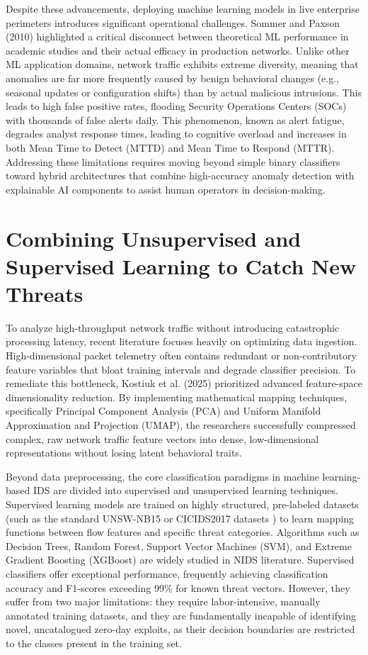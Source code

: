 \documentclass[12pt,a4paper]{report}
\begin{document}
Despite these advancements, deploying machine learning models in live enterprise perimeters introduces significant operational challenges. Sommer and Paxson (2010) \cite{sommer2010} highlighted a critical disconnect between theoretical ML performance in academic studies and their actual efficacy in production networks. Unlike other ML application domains, network traffic exhibits extreme diversity, meaning that anomalies are far more frequently caused by benign behavioral changes (e.g., seasonal updates or configuration shifts) than by actual malicious intrusions. This leads to high false positive rates, flooding Security Operations Centers (SOCs) with thousands of false alerts daily. This phenomenon, known as alert fatigue, degrades analyst response times, leading to cognitive overload and increases in both Mean Time to Detect (MTTD) and Mean Time to Respond (MTTR). Addressing these limitations requires moving beyond simple binary classifiers toward hybrid architectures that combine high-accuracy anomaly detection with explainable AI components to assist human operators in decision-making.

\section{Combining Unsupervised and Supervised Learning to Catch New Threats}

To analyze high-throughput network traffic without introducing catastrophic processing latency, recent literature focuses heavily on optimizing data ingestion. High-dimensional packet telemetry often contains redundant or non-contributory feature variables that bloat training intervals and degrade classifier precision. To remediate this bottleneck, Kostiuk et al. (2025) \cite{kostiuk2025} prioritized advanced feature-space dimensionality reduction. By implementing mathematical mapping techniques, specifically Principal Component Analysis (PCA) and Uniform Manifold Approximation and Projection (UMAP), the researchers successfully compressed complex, raw network traffic feature vectors into dense, low-dimensional representations without losing latent behavioral traits.

Beyond data preprocessing, the core classification paradigms in machine learning-based IDS are divided into supervised and unsupervised learning techniques. Supervised learning models are trained on highly structured, pre-labeled datasets (such as the standard UNSW-NB15 or CICIDS2017 datasets \cite{sharafaldin2018}) to learn mapping functions between flow features and specific threat categories. Algorithms such as Decision Trees, Random Forest, Support Vector Machines (SVM), and Extreme Gradient Boosting (XGBoost) are widely studied in NIDS literature. Supervised classifiers offer exceptional performance, frequently achieving classification accuracy and F1-scores exceeding 99\% for known threat vectors. However, they suffer from two major limitations: they require labor-intensive, manually annotated training datasets, and they are fundamentally incapable of identifying novel, uncatalogued zero-day exploits, as their decision boundaries are restricted to the classes present in the training set.
\end{document}
